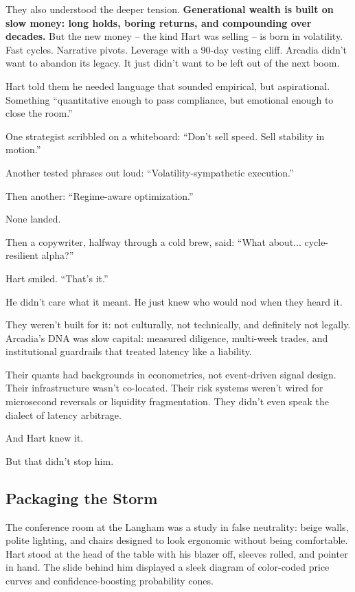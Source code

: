 \medskip

They also understood the deeper tension.
\textbf{Generational wealth is built on slow money: long holds, boring returns, and compounding over decades.}
But the new money -- the kind Hart was selling -- is born in volatility.
Fast cycles. Narrative pivots. Leverage with a 90-day vesting cliff.
Arcadia didn’t want to abandon its legacy.
It just didn’t want to be left out of the next boom.

Hart told them he needed language that sounded empirical, but aspirational.
Something ``quantitative enough to pass compliance, but emotional enough to close the room.''

One strategist scribbled on a whiteboard:
``Don’t sell speed. Sell stability in motion.''

Another tested phrases out loud: ``Volatility-sympathetic execution.''

Then another: ``Regime-aware optimization.''

None landed.

Then a copywriter, halfway through a cold brew, said:
``What about... cycle-resilient alpha?''

Hart smiled.
``That’s it.''

He didn’t care what it meant.
He just knew who would nod when they heard it.

They weren’t built for it: not culturally, not technically, and definitely not legally.
Arcadia’s DNA was slow capital: measured diligence, multi-week trades, and institutional guardrails that treated 
latency like a liability.

Their quants had backgrounds in econometrics, not event-driven signal design.
Their infrastructure wasn’t co-located.
Their risk systems weren’t wired for microsecond reversals or liquidity fragmentation.
They didn’t even speak the dialect of latency arbitrage.

And Hart knew it.

But that didn’t stop him.



\subsection{Packaging the Storm}

The conference room at the Langham was a study in false neutrality: beige walls, polite lighting, and
chairs designed to look ergonomic without being comfortable.  
Hart stood at the head of the table with his blazer off, sleeves rolled, and pointer in hand. The slide 
behind him displayed a sleek diagram of color-coded price curves and confidence-boosting probability cones.


